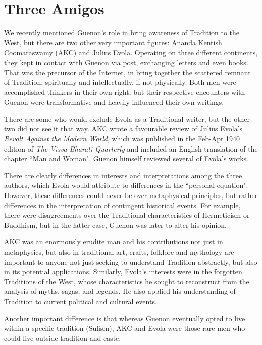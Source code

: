 \section{Three Amigos}

We recently mentioned Guenon's role in bring awareness of Tradition to the West, but there are two other very important figures: Ananda Kentish Coomaraswamy (AKC) and Julius Evola. Operating on three different continents, they kept in contact with Guenon via post, exchanging letters and even books. That was the precursor of the Internet, in bring together the scattered remnant of Tradition, spiritually and intellectually, if not physically. Both men were accomplished thinkers in their own right, but their respective encounters with Guenon were transformative and heavily influenced their own writings. 

There are some who would exclude Evola as a Traditional writer, but the other two did not see it that way. AKC wrote a favourable review of Julius Evola's \emph{Revolt Against the Modern World}, which was published in the Feb-Apr 1940 edition of \emph{The Visva-Bharati Quarterly} and included an English translation of the chapter ``Man and Woman". Guenon himself reviewed several of Evola's works. 

There are clearly differences in interests and interpretations among the three authors, which Evola would attribute to differences in the ``personal equation". However, these differences could never be over metaphysical principles, but rather differences in the interpretation of contingent historical events. For example, there were disagreements over the Traditional characteristics of Hermeticism or Buddhism, but in the latter case, Guenon was later to alter his opinion. 

AKC was an enormously erudite man and his contributions not just in metaphysics, but also in traditional art, crafts, folklore and mythology are important to anyone not just seeking to understand Tradition abstractly, but also in its potential applications. Similarly, Evola's interests were in the forgotten Traditions of the West, whose characteristics he sought to reconstruct from the analysis of myths, sagas, and legends. He also applied his understanding of Tradition to current political and cultural events. 

Another important difference is that whereas Guenon eventually opted to live within a specific tradition (Sufism), AKC and Evola were those rare men who could live outside tradition and caste.



